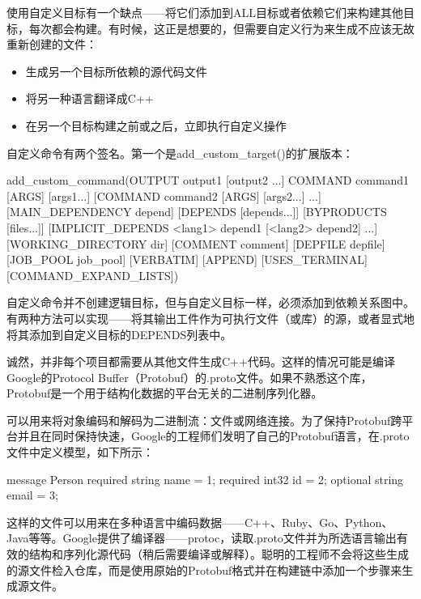 
使用自定义目标有一个缺点——将它们添加到ALL目标或者依赖它们来构建其他目标，每次都会构建。有时候，这正是想要的，但需要自定义行为来生成不应该无故重新创建的文件：

\begin{itemize}
\item
生成另一个目标所依赖的源代码文件

\item
将另一种语言翻译成C++

\item
在另一个目标构建之前或之后，立即执行自定义操作
\end{itemize}

自定义命令有两个签名。第一个是add\_custom\_target()的扩展版本：

\begin{shell}
add_custom_command(OUTPUT output1 [output2 ...]
                   COMMAND command1 [ARGS] [args1...]
                   [COMMAND command2 [ARGS] [args2...] ...]
                   [MAIN_DEPENDENCY depend]
                   [DEPENDS [depends...]]
                   [BYPRODUCTS [files...]]
                   [IMPLICIT_DEPENDS <lang1> depend1
                                    [<lang2> depend2] ...]
                   [WORKING_DIRECTORY dir]
                   [COMMENT comment]
                   [DEPFILE depfile]
                   [JOB_POOL job_pool]
                   [VERBATIM] [APPEND] [USES_TERMINAL]
                   [COMMAND_EXPAND_LISTS])
\end{shell}

自定义命令并不创建逻辑目标，但与自定义目标一样，必须添加到依赖关系图中。有两种方法可以实现——将其输出工件作为可执行文件（或库）的源，或者显式地将其添加到自定义目标的DEPENDS列表中。


诚然，并非每个项目都需要从其他文件生成C++代码。这样的情况可能是编译Google的Protocol Buffer（Protobuf）的.proto文件。如果不熟悉这个库，Protobuf是一个用于结构化数据的平台无关的二进制序列化器。

可以用来将对象编码和解码为二进制流：文件或网络连接。为了保持Protobuf跨平台并且在同时保持快速，Google的工程师们发明了自己的Protobuf语言，在.proto文件中定义模型，如下所示：

\begin{shell}
message Person {
    required string name = 1;
    required int32 id = 2;
    optional string email = 3;
}
\end{shell}

这样的文件可以用来在多种语言中编码数据——C++、Ruby、Go、Python、Java等等。Google提供了编译器——protoc，读取.proto文件并为所选语言输出有效的结构和序列化源代码（稍后需要编译或解释）。聪明的工程师不会将这些生成的源文件检入仓库，而是使用原始的Protobuf格式并在构建链中添加一个步骤来生成源文件。

